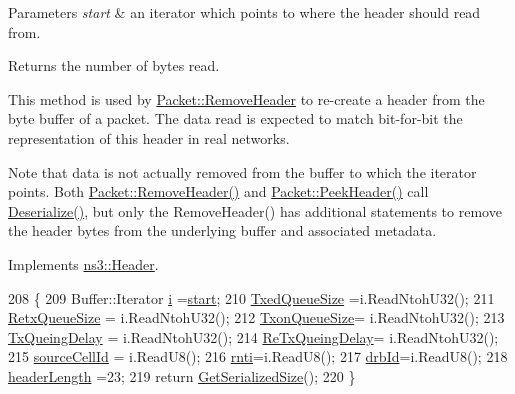 \begin{DoxyParams}{Parameters}
{\em start} & an iterator which points to where the header should read from. \\
\hline
\end{DoxyParams}
\begin{DoxyReturn}{Returns}
the number of bytes read.
\end{DoxyReturn}
This method is used by \hyperlink{classns3_1_1Packet_a0961eccf975d75f902d40956c93ba63e}{Packet\+::\+Remove\+Header} to re-\/create a header from the byte buffer of a packet. The data read is expected to match bit-\/for-\/bit the representation of this header in real networks.

Note that data is not actually removed from the buffer to which the iterator points. Both \hyperlink{classns3_1_1Packet_a0961eccf975d75f902d40956c93ba63e}{Packet\+::\+Remove\+Header()} and \hyperlink{classns3_1_1Packet_aadc63487bea70945c418f4c3e9b81964}{Packet\+::\+Peek\+Header()} call \hyperlink{classns3_1_1EpcX2AssistantInfoHeader_af56c3034b3963ab2c7bb7e0303761998}{Deserialize()}, but only the Remove\+Header() has additional statements to remove the header bytes from the underlying buffer and associated metadata. 

Implements \hyperlink{classns3_1_1Header_a78be9400bb66b2a8543606f395ef5396}{ns3\+::\+Header}.


\begin{DoxyCode}
208                                                          \{
209         Buffer::Iterator \hyperlink{bernuolliDistribution_8m_a6f6ccfcf58b31cb6412107d9d5281426}{i} =\hyperlink{namespacevisualizer_1_1core_a2a35e5d8a34af358b508dac8635754e0}{start};
210         \hyperlink{classns3_1_1EpcX2AssistantInfoHeader_aa2a81acf2b583acc011d68ef3e232e3a}{TxedQueueSize} =i.ReadNtohU32();
211         \hyperlink{classns3_1_1EpcX2AssistantInfoHeader_acd50d1f05f743860d9cb56a7ecbe0b90}{RetxQueueSize} = i.ReadNtohU32();
212         \hyperlink{classns3_1_1EpcX2AssistantInfoHeader_a0c758716c881b7aabbb59f47fb4de1f9}{TxonQueueSize}= i.ReadNtohU32();
213         \hyperlink{classns3_1_1EpcX2AssistantInfoHeader_a9c1dab3b089d70b7e138ae84faed72b5}{TxQueingDelay} = i.ReadNtohU32();
214         \hyperlink{classns3_1_1EpcX2AssistantInfoHeader_a9c1be7cf38f4cf38ff9aa2b56f8519af}{ReTxQueingDelay}= i.ReadNtohU32();
215         \hyperlink{classns3_1_1EpcX2AssistantInfoHeader_abad5c80790df2ba30a2965b92d4980ef}{sourceCellId} = i.ReadU8();
216         \hyperlink{classns3_1_1EpcX2AssistantInfoHeader_abdef6f91f7e05ecbf7278e3d550fa350}{rnti}=i.ReadU8();
217         \hyperlink{classns3_1_1EpcX2AssistantInfoHeader_afb44d36452a966cc31cfdecf0e720b18}{drbId}=i.ReadU8();
218         \hyperlink{classns3_1_1EpcX2AssistantInfoHeader_a6ad88c9aea33c94fd0150bdc790b6c2c}{headerLength} =23;
219         \textcolor{keywordflow}{return} \hyperlink{classns3_1_1EpcX2AssistantInfoHeader_a5364fe2f975eb8d258aea05dcdc1e5ca}{GetSerializedSize}();
220 \}
\end{DoxyCode}


